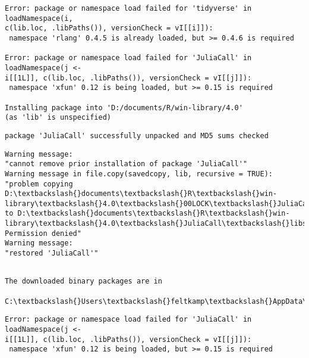\documentclass[11pt]{article}
\begin{document}
    \begin{Verbatim}[commandchars=\\\{\}]
Error: package or namespace load failed for 'tidyverse' in loadNamespace(i,
c(lib.loc, .libPaths()), versionCheck = vI[[i]]):
 namespace 'rlang' 0.4.5 is already loaded, but >= 0.4.6 is required

Error: package or namespace load failed for 'JuliaCall' in loadNamespace(j <-
i[[1L]], c(lib.loc, .libPaths()), versionCheck = vI[[j]]):
 namespace 'xfun' 0.12 is being loaded, but >= 0.15 is required

Installing package into 'D:/documents/R/win-library/4.0'
(as 'lib' is unspecified)

    \end{Verbatim}

    \begin{Verbatim}[commandchars=\\\{\}]
package 'JuliaCall' successfully unpacked and MD5 sums checked
    \end{Verbatim}

    \begin{Verbatim}[commandchars=\\\{\}]
Warning message:
"cannot remove prior installation of package 'JuliaCall'"
Warning message in file.copy(savedcopy, lib, recursive = TRUE):
"problem copying D:\textbackslash{}documents\textbackslash{}R\textbackslash{}win-
library\textbackslash{}4.0\textbackslash{}00LOCK\textbackslash{}JuliaCall\textbackslash{}libs\textbackslash{}x64\textbackslash{}JuliaCall.dll to D:\textbackslash{}documents\textbackslash{}R\textbackslash{}win-
library\textbackslash{}4.0\textbackslash{}JuliaCall\textbackslash{}libs\textbackslash{}x64\textbackslash{}JuliaCall.dll: Permission denied"
Warning message:
"restored 'JuliaCall'"
    \end{Verbatim}

    \begin{Verbatim}[commandchars=\\\{\}]

The downloaded binary packages are in
        C:\textbackslash{}Users\textbackslash{}feltkamp\textbackslash{}AppData\textbackslash{}Local\textbackslash{}Temp\textbackslash{}RtmpIZ8FLS\textbackslash{}downloaded\_packages
    \end{Verbatim}

    \begin{Verbatim}[commandchars=\\\{\}]
Error: package or namespace load failed for 'JuliaCall' in loadNamespace(j <-
i[[1L]], c(lib.loc, .libPaths()), versionCheck = vI[[j]]):
 namespace 'xfun' 0.12 is being loaded, but >= 0.15 is required

    \end{Verbatim}
\end{document}
